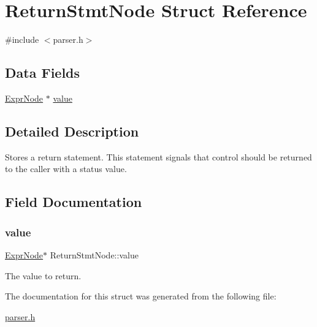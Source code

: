 \hypertarget{struct_return_stmt_node}{}\section{Return\+Stmt\+Node Struct Reference}
\label{struct_return_stmt_node}


{\ttfamily \#include $<$parser.\+h$>$}

\subsection*{Data Fields}
\begin{DoxyCompactItemize}
\item 
\hyperlink{struct_expr_node}{Expr\+Node} $\ast$ \hyperlink{struct_return_stmt_node_ac610b54406ae3bc54e3d5c4e9fcb1d2e}{value}
\end{DoxyCompactItemize}


\subsection{Detailed Description}
Stores a return statement. This statement signals that control should be returned to the caller with a status value. 

\subsection{Field Documentation}
\mbox{\label{struct_return_stmt_node_ac610b54406ae3bc54e3d5c4e9fcb1d2e}} 
\subsubsection{\texorpdfstring{value}{value}}
{\footnotesize\ttfamily \hyperlink{struct_expr_node}{Expr\+Node}$\ast$ Return\+Stmt\+Node\+::value}

The value to return. 

The documentation for this struct was generated from the following file\+:\begin{DoxyCompactItemize}
\item 
\hyperlink{parser_8h}{parser.\+h}\end{DoxyCompactItemize}
